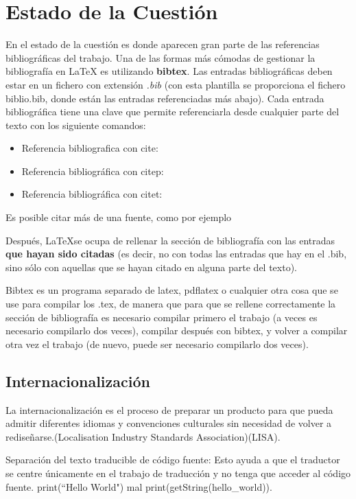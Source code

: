 \chapter{Estado de la Cuestión}
\label{cap:estadoDeLaCuestion}

En el estado de la cuestión es donde aparecen gran parte de las referencias bibliográficas del trabajo. Una de las formas más cómodas de gestionar la bibliografía en {\LaTeX} es utilizando \textbf{bibtex}. Las entradas bibliográficas deben estar en un fichero con extensión \textit{.bib} (con esta plantilla se proporciona el fichero biblio.bib, donde están las entradas referenciadas más abajo). Cada entrada bibliográfica tiene una clave que permite referenciarla desde cualquier parte del texto con los siguiente comandos:

\begin{itemize}
\item Referencia bibliografica con cite: \cite{ldesc2e}
\item Referencia bibliográfica con citep: \citep{notsoshort}
\item Referencia bibliográfica con citet: \citet{latexAPrimer}
\end{itemize}

Es posible citar más de una fuente, como por ejemplo \citep{latexCompanion,LaTeXLamport,texKnuth}

Después, \LaTeX se ocupa de rellenar la sección de bibliografía con las entradas \textbf{que hayan sido citadas} (es decir, no con todas las entradas que hay en el .bib, sino sólo con aquellas que se hayan citado en alguna parte del texto).

Bibtex es un programa separado de latex, pdflatex o cualquier otra cosa que se use para compilar los .tex, de manera que para que se rellene correctamente la sección de bibliografía es necesario compilar primero el trabajo (a veces es necesario compilarlo dos veces), compilar después con bibtex, y volver a compilar otra vez el trabajo (de nuevo, puede ser necesario compilarlo dos veces). 

\section{Internacionalización}
La internacionalización es el proceso de preparar un producto para que pueda admitir diferentes idiomas y convenciones culturales sin necesidad de volver a rediseñarse.(Localisation Industry Standards Association)(LISA).

Separación del texto traducible de código fuente: Esto ayuda a que el traductor se centre únicamente en el trabajo de traducción y no tenga que acceder al código fuente.
print(“Hello World") mal   print(getString(hello\_world)).

